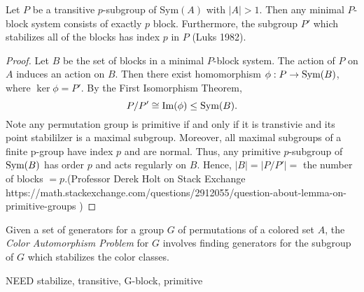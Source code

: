 \begin{lemma}Let $P$ be a transitive $p$-subgroup of Sym$(A)$ with $|A|>1$. Then any minimal $P$-block system consists of exactly $p$ block. Furthermore, the subgroup $P'$ which stabilizes all of the blocks has index $p$ in $P$ (Luks 1982). 
\end{lemma}
\begin{proof}
    Let $B$ be the set of blocks in a minimal $P$-block system. The action of $P$ on $A$ induces an action on $B$. Then there exist homomorphism $\phi:P\rightarrow\text{Sym}(B)$, where $\ker\phi=P'$. By the First Isomorphism Theorem, \[P/P'\cong\text{Im}(\phi)\le\text{Sym}(B).\]
    Note any permutation group is primitive if and only if it is transtivie and its point stabililzer is a maximal subgroup. Moreover, all maximal subgroups of a finite p-group have index $p$ and are normal. Thus, any primitive $p$-subgroup of $\text{Sym}(B)$ has order $p$ and acts regularly on $B$. Hence, $|B|=|P/P'|=$ the number of blocks $=p$.(Professor Derek Holt on Stack Exchange https://math.stackexchange.com/questions/2912055/question-about-lemma-on-primitive-groups )
\end{proof}
\begin{definition}
    Given a set of generators for a group $G$ of permutations of a colored set $A$, the \textit{Color Automorphism Problem} for $G$ involves finding generators for the subgroup of $G$ which stabilizes the color classes.
\end{definition}

\begin{definition}
NEED stabilize, transitive, G-block, primitive
\end{definition}
